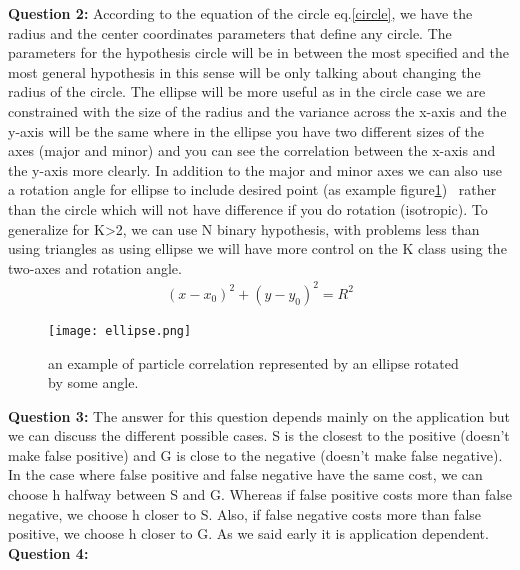 \documentclass{article}
\begin{document}
\newline
\newline
\textbf{Question 2:}
\newline
According to the equation of the circle eq.\ref{circle}, we have the radius and the center coordinates parameters that define any circle. The parameters for the hypothesis circle will be in between the most specified and  the most  general hypothesis in this sense will be only talking about changing the radius of the circle. The ellipse will be more useful as in the circle case we are constrained with the size of the radius and the variance across the x-axis and the y-axis will be the same where in the ellipse you have two different sizes of the axes (major and minor) and you can see the correlation between the x-axis and the y-axis more clearly. In addition to the major and minor axes we can also use a rotation angle for ellipse to include desired point (as example figure\ref{ellipse}) ~rather than the circle which will not have difference if you do rotation (isotropic). To generalize for K>2, we can use N binary hypothesis, with problems less than using triangles as using ellipse we will have more control on the K class using the two-axes and rotation angle.
\begin{eqnarray}\label{circle}
  \left( {x - x_0 } \right)^2 + \left( {y - y_0 } \right)^2 = R^2
\end{eqnarray}
\begin{figure}
\centering
  \texttt{[image: ellipse.png]}
  \caption{an example of particle correlation represented by an ellipse rotated by some angle.}
\label{ellipse}
\end{figure}
\newline
\newline
\textbf{Question 3:}
\newline The answer for this question depends mainly on the application but we can discuss the different possible cases. S is the closest to the positive (doesn't make false positive) and G is close to the negative (doesn't make false negative). In the case where false positive and false negative have the same cost, we can choose h halfway between S and G. Whereas if false positive costs more than false negative, we choose h closer to S. Also, if false negative costs more than false positive, we choose h closer to G. As we said early it is application dependent.
\newline
\newline
\textbf{Question 4:}
\newline
\end{document}
